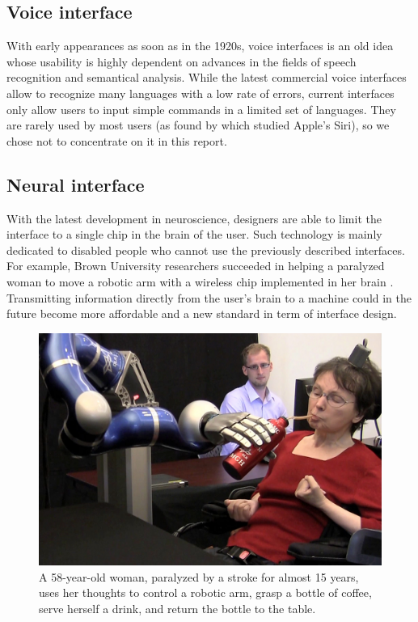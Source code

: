 \documentclass[a4paper,11pt] {article}
\theoremstyle{definition}
\begin{document}
    \subsection{Voice interface}

    With early appearances as soon as in the 1920s, voice interfaces is an old idea whose usability is highly dependent on advances in the fields of speech recognition and semantical analysis. While the latest commercial voice interfaces allow to recognize many languages with a low rate of errors, current interfaces only allow users to input simple commands in a limited set of languages. They are rarely used by most users (as found by \cite{SiriNotUsed} which studied Apple's Siri), so we chose not to concentrate on it in this report.

    \subsection{Neural interface}
    With the latest development in neuroscience, designers are able to limit the interface to a single chip in the brain of the user. Such technology is mainly dedicated to disabled people who cannot use the previously described interfaces. For example, Brown University researchers succeeded in helping a paralyzed woman to move a robotic arm with a wireless chip implemented in her brain \cite{brownRobotic}. Transmitting information directly from the user's brain to a machine could in the future become more affordable and a new standard in term of interface design.

    \begin{figure}[!h]
    \centering
    \includegraphics[scale=0.15]{fig-report/robotic-arm-brain.jpg}
    \caption{A 58-year-old woman, paralyzed by a stroke for almost 15 years, uses her thoughts to control a robotic arm, grasp a bottle of coffee, serve herself a drink, and return the bottle to the table\cite{brownEdu}.}
    \end{figure}
\end{document}
